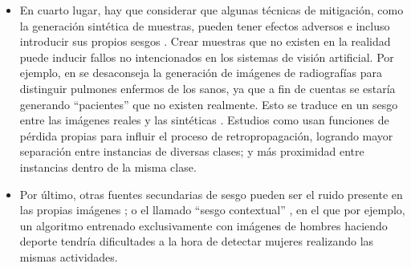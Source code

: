 \begin{itemize}
    \item En cuarto lugar, hay que considerar que algunas técnicas de mitigación, como la generación sintética de muestras, pueden tener efectos adversos e incluso introducir sus propios sesgos \cite{yan2019joint}. Crear muestras que no existen en la realidad puede inducir fallos no intencionados en los sistemas de visión artificial. Por ejemplo, en \citet{rahimzadeh2020modified} se desaconseja la generación de imágenes de radiografías para distinguir pulmones enfermos de los sanos, ya que a fin de cuentas se estaría generando ``pacientes'' que no existen realmente. Esto se traduce en un sesgo entre las imágenes reales y las sintéticas \cite{yilma2021generation}. Estudios como \citet{yan2019joint} usan funciones de pérdida propias para influir el proceso de retropropagación, logrando mayor separación entre instancias de diversas clases; y más proximidad entre instancias dentro de la misma clase.

    \item Por último, otras fuentes secundarias de sesgo pueden ser el ruido presente en las propias imágenes \cite{li2019learning,tuncc2020fuzzy}; o el llamado ``sesgo contextual'' \cite{jiang2019robust}, en el que por ejemplo, un algoritmo entrenado exclusivamente con imágenes de hombres haciendo deporte tendría dificultades a la hora de detectar mujeres realizando las mismas actividades.

\end{itemize}



